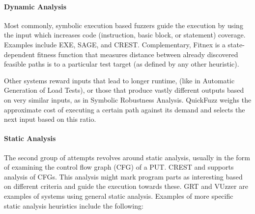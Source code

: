 \documentclass{article}
\begin{document}
\begin{multicols}{2}
    \paragraph{Dynamic Analysis} Most commonly, symbolic execution based fuzzers guide the execution by using the input which increases code (instruction, basic block, or statement) coverage. Examples include EXE\cite{EXE}, SAGE\cite{SAGE}, and CREST\cite{CREST}. Complementary, Fitnex\cite{Fitnex} is a state-dependent fitness function that measures distance between already discovered feasible paths is to a particular test target (as defined by any other heuristic).

    Other systems reward inputs that lead to longer runtime, (like in Automatic Generation of Load Tests\cite{AGLT}), or those that produce vastly different outputs based on very similar inputs, as in Symbolic Robustness Analysis\cite{SRA}. QuickFuzz\cite{QuickFuzz} weighs the approximate cost of executing a certain path against its demand and selects the next input based on this ratio.

    \paragraph{Static Analysis} The second group of attempts revolves around static analysis, usually in the form of examining the control flow graph (CFG) of a PUT. CREST\cite{CREST} \cite{ReviewThreeDecades} and supports analysis of CFGs. This analysis might mark program parts as interesting based on different criteria and guide the execution towards these. GRT\cite{GRT} and VUzzer\cite{VUzzer} are examples of systems using general static analysis. Examples of more specific static analysis heuristics include the following:


\end{multicols}
\end{document}
